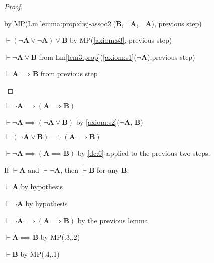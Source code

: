 \documentclass{amsart}%
\newcommand\metavariable[1]{\boldsymbol{#1}}
\begin{document}
\begin{proof}
\begin{enumerate}
\begin{pf}
  by MP(Lm\ref{lemma:prop:disj-assoc2}($\metavariable{B}$, $\neg\metavariable{A}$, $\neg\metavariable{A}$), previous step)
\item $\vdash(\neg\metavariable{A}\lor\neg\metavariable{A})\lor\metavariable{B}$
  by MP(\ref{axiom:s3}, previous step)
\item $\vdash\neg\metavariable{A}\lor\metavariable{B}$ from Lm\ref{lem3:prop}(\ref{axiom:s1}($\neg\metavariable{A}$),previous step)
\item $\vdash\metavariable{A}\implies\metavariable{B}$ from previous step
  \end{pf}
\end{enumerate}
\end{proof}

\begin{lemma}\label{lemma:prop:explode-helper}
$\vdash\neg\metavariable{A}\implies(\metavariable{A}\implies\metavariable{B})$
\end{lemma}

\begin{pf}
\item $\vdash\neg\metavariable{A}\implies(\neg\metavariable{A}\lor\metavariable{B})$
  by \ref{axiom:s2}($\neg\metavariable{A}$, $\metavariable{B}$)
\item $\vdash(\neg\metavariable{A}\lor\metavariable{B})\implies(\metavariable{A}\implies\metavariable{B})$
\item $\vdash\neg\metavariable{A}\implies(\metavariable{A}\implies\metavariable{B})$
  by \ref{dc:6} applied to the previous two steps.
\end{pf}

\begin{lemma}\label{lemma:prop:explosion}
If $\vdash\metavariable{A}$ and $\vdash\neg\metavariable{A}$, then
$\vdash\metavariable{B}$ for any $\metavariable{B}$.
\end{lemma}

\begin{pf}
\item $\vdash\metavariable{A}$ by hypothesis
\item $\vdash\neg\metavariable{A}$ by hypothesis
\item $\vdash\neg\metavariable{A}\implies(\metavariable{A}\implies\metavariable{B})$
  by the previous lemma
\item $\vdash\metavariable{A}\implies\metavariable{B}$ by MP(.3,.2)
\item $\vdash\metavariable{B}$ by MP(.4,.1)
\end{pf}
\end{document}
